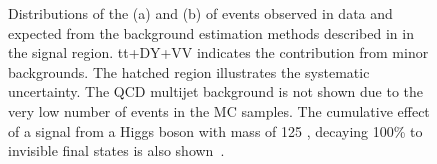 \begin{figure}
  \caption{Distributions of the \METnoMU (a) and \Mjj (b) of events observed in data and expected from the background estimation methods described in  in the signal region. tt+DY+VV indicates the contribution from minor backgrounds. The hatched region illustrates the systematic uncertainty. The QCD multijet background is not shown due to the very low number of events in the \ac{MC} samples. The cumulative effect of a signal from a Higgs boson with mass of 125 \GeV, decaying 100\% to invisible final states is also shown~\cite{Chatrchyan:2014tja}.}
  \label{fig:promptresults}
\end{figure}

